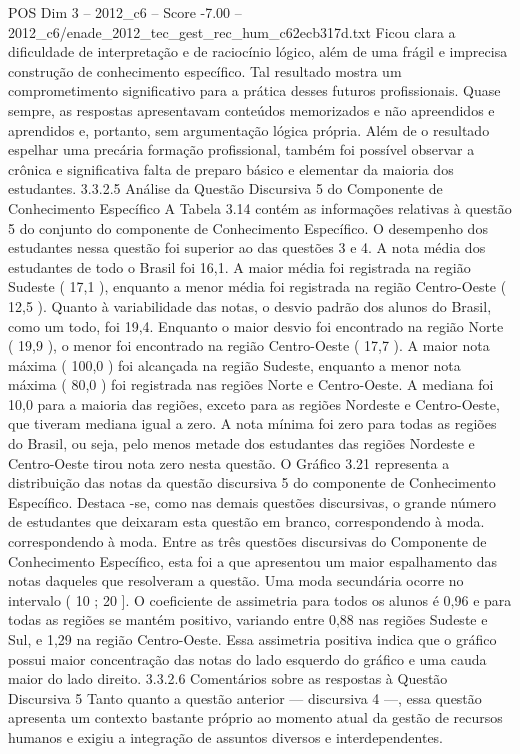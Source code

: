 \begin{textsample}{POS Dim 3 – 2012\_c6 – Score -7.00 – 2012\_c6/enade\_2012\_tec\_gest\_rec\_hum\_c62ecb317d.txt}
Ficou clara a dificuldade de interpretação e de raciocínio lógico, além de uma frágil e imprecisa construção de conhecimento específico.
Tal resultado mostra um comprometimento significativo para a prática desses futuros profissionais.
Quase sempre, as respostas apresentavam conteúdos memorizados e não apreendidos e aprendidos e, portanto, sem argumentação lógica própria.
Além de o resultado espelhar uma precária formação profissional, também foi possível observar a crônica e significativa falta de preparo básico e elementar da maioria dos estudantes. 3.3.2.5 Análise da Questão Discursiva 5 do Componente de Conhecimento Específico A Tabela 3.14 contém as informações relativas à questão 5 do conjunto do componente de Conhecimento Específico.
O desempenho dos estudantes nessa questão foi superior ao das questões 3 e 4.
A nota média dos estudantes de todo o Brasil foi 16,1.
A maior média foi registrada na região Sudeste ( 17,1 ), enquanto a menor média foi registrada na região Centro-Oeste ( 12,5 ).
Quanto à variabilidade das notas, o desvio padrão dos alunos do Brasil, como um todo, foi 19,4.
Enquanto o maior desvio foi encontrado na região Norte ( 19,9 ), o menor foi encontrado na região Centro-Oeste ( 17,7 ).
A maior nota máxima ( 100,0 ) foi alcançada na região Sudeste, enquanto a menor nota máxima ( 80,0 ) foi registrada nas regiões Norte e Centro-Oeste.
A mediana foi 10,0 para a maioria das regiões, exceto para as regiões Nordeste e Centro-Oeste, que tiveram mediana igual a zero.
A nota mínima foi zero para todas as regiões do Brasil, ou seja, pelo menos metade dos estudantes das regiões Nordeste e Centro-Oeste tirou nota zero nesta questão.
O Gráfico 3.21 representa a distribuição das notas da questão discursiva 5 do componente de Conhecimento Específico.
Destaca -se, como nas demais questões discursivas, o grande número de estudantes que deixaram esta questão em branco, correspondendo à moda. correspondendo à moda.
Entre as três questões discursivas do Componente de Conhecimento Específico, esta foi a que apresentou um maior espalhamento das notas daqueles que resolveram a questão.
Uma moda secundária ocorre no intervalo ( 10 ; 20 ].
O coeficiente de assimetria para todos os alunos é 0,96 e para todas as regiões se mantém positivo, variando entre 0,88 nas regiões Sudeste e Sul, e 1,29 na região Centro-Oeste.
Essa assimetria positiva indica que o gráfico possui maior concentração das notas do lado esquerdo do gráfico e uma cauda maior do lado direito. 3.3.2.6 Comentários sobre as respostas à Questão Discursiva 5 Tanto quanto a questão anterior — discursiva 4 —, essa questão apresenta um contexto bastante próprio ao momento atual da gestão de recursos humanos e exigiu a integração de assuntos diversos e interdependentes.

\end{textsample}
